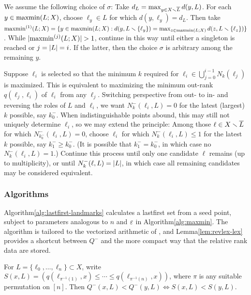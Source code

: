 \documentclass{article}
\begin{document}
We assume the following choice of \(\sigma\): Take
\(d_L = \max_{y \in X \smallsetminus \overline{L}}{d(y,L)}\). For each
\(y \in \operatorname{maxmin}(L;X)\), choose \(\ell_y \in L\) for which
\(d(y,\ell_y) = d_L\). Then take
\(\operatorname{maxmin}^{(1)}(L;X) = \{y \in \operatorname{maxmin}(L;X) : d(y,L \smallsetminus \{\ell_y\}) = \max_{z \in \operatorname{maxmin}(L;X)}{d(z,L \smallsetminus \{\ell_z\})}\}\).
While \(\lvert \operatorname{maxmin}^{(j)}(L;X)\rvert > 1\), continue in this way until
either a singleton is reached or \(j=\lvert L\rvert=i\). If the latter, then
the choice \(\sigma\) is arbitrary among the remaining \(y\).

Suppose \(\ell_i\) is selected so that the minimum \(k\) required for
\(\ell_i \in \bigcup_{j=0}^{i-1}{N_k(\ell_j)}\) is maximized. This is
equivalent to maximizing the minimum out-rank \(q(\ell_j,\ell_i)\) of
\(\ell_i\) from any \(\ell_j\). Switching perspective from out- to in-
and reversing the roles of \(L\) and \(\ell_i\), we want
\(N^-_k(\ell_i,L)=0\) for the latest (largest) \(k\) possible, say
\(k^-_0\). When indistinguishable points abound, this may still not
uniquely determine \(\ell_i\), so we may extend the principle: Among
those \(\ell\in X\smallsetminus \overline{L}\) for which \(N^-_{k^-_0}(\ell_i,L)=0\),
choose \(\ell_i\) for which \(N^-_{k}(\ell_i,L) \leq 1\) for the latest
\(k\) possible, say \(k^-_1 \geq k^-_0\). (It is possible that
\(k^-_1 = k^-_0\), in which case no \(N^-_k(\ell_i,L) = 1\).) Continue
this process until only one candidate \(\ell\) remains (up to
multiplicity), or until \(N^-_{k}(\ell,L)=\lvert L\rvert\), in which case all
remaining candidates may be considered equivalent.

\hypertarget{algorithms}{%
\subsubsection{Algorithms}\label{algorithms}}

Algorithm\nbs\ref{alg:lastfirst-landmarks} calculates a lastfirst set
from a seed point, subject to parameters analogous to \(n\) and \(\varepsilon\)
in Algorithm\nbs\ref{alg:maxmin}. The algorithm is tailored to the
vectorized arithmetic of , and Lemma\nbs\ref{lem:revlex-lex}
provides a shortcut between \(Q^-\) and the more compact way that the
relative rank data are stored.

\begin{lemma}\label{lem:revlex-lex}
For $L = \{ \ell_0, \ldots, \ell_n \} \subset X$, write $S(x,L) = ( q(\ell_{\pi^{-1}(1)},x) \leq \cdots \leq q(\ell_{\pi^{-1}(n)},x) )$, where $\pi$ is any suitable permutation on $[n]$.
Then $Q^-(x,L) < Q^-(y,L) \Leftrightarrow S(x,L) < S(y,L)$.
\end{lemma}
\end{document}
